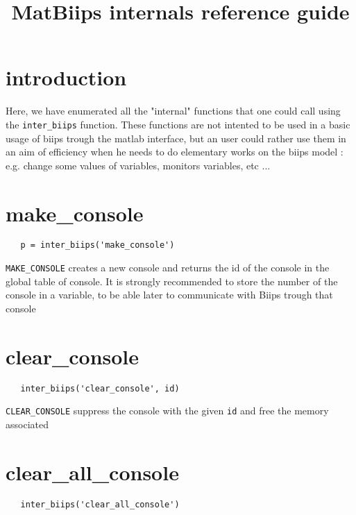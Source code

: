 \documentclass[11pt,twoside]{article}
\begin{document}
\title{MatBiips internals reference guide}
\date{}

\maketitle

\tableofcontents

\section{introduction}

  Here, we have enumerated all the "internal" functions that one could call using the \texttt{inter\_biips} function. These functions are not intented
  to be used in a basic usage of biips trough the matlab interface, but an user could rather use them in an aim of efficiency when he needs to
  do elementary works on the biips model : e.g. change some values of variables, monitors variables, etc ...

\section{make\_console}
 \begin{lstlisting}
   p = inter_biips('make_console')
 \end{lstlisting}
   
   \texttt{MAKE\_CONSOLE}  creates a new console and returns the id of the console in the global table of console. It
   is strongly recommended to store the number of the console in a variable, to be able later to communicate with Biips trough that
   console

\section{clear\_console}

 \begin{lstlisting}
   inter_biips('clear_console', id)
 \end{lstlisting}

  \texttt{CLEAR\_CONSOLE} suppress the console with the given \texttt{id} and free the memory associated

\section{clear\_all\_console}
 
 \begin{lstlisting}
   inter_biips('clear_all_console')
 \end{lstlisting}
\end{document}
